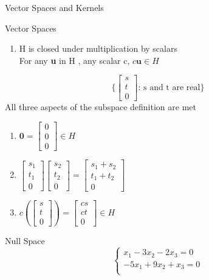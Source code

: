 \documentclass[a4paper, 12pt]{article}
\begin{document}
\begin{section}{Vector Spaces and Kernels}
\begin{subsection}{Vector Spaces}
\begin{enumerate}
\item{H is closed under multiplication by scalars\\
For any \textbf{u} in H , any scalar c, $c\textbf{u}\in H$}
\end{enumerate}
\begin{equation}
\Biggl\{ \begin{bmatrix} s \\ t \\ 0 \end{bmatrix} 
\mbox{: s and t are real} \Biggl\}
\end{equation}
All three aspects of the subspace definition are met
\begin{enumerate}
\item{$\textbf{0}=\begin{bmatrix} 0\\ 0\\ 0 \end{bmatrix} \in H$}
\item{$\begin{bmatrix} s_1\\ t_1\\ 0 \end{bmatrix} 
\begin{bmatrix} s_2\\ t_2\\ 0 \end{bmatrix}= 
\begin{bmatrix} s_1+s_{2}\\ t_1+t_2\\ 0 \end{bmatrix}$}
\item{$c(\begin{bmatrix} s\\ t\\ 0 \end{bmatrix}) = \begin{bmatrix} 
cs\\ ct\\ 0\end{bmatrix} \in H$}
\end{enumerate}
\end{subsection}
\begin{subsection}{Null Space}
\begin{equation}
\begin{cases}
	x_1-3x_2-2x_3=0 \\
	-5x_1+9x_2+x_3=0\\
\end{cases}
\end{equation}

\end{subsection}
\end{section}
\end{document}
